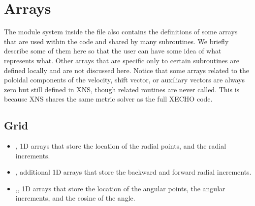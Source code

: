 \documentclass[letterpaper,10pt,english]{sphinxmanual}
\begin{document}
\chapter{Arrays}
\label{\detokenize{arrays:arrays}}\label{\detokenize{arrays::doc}}
\sphinxAtStartPar
The module system inside the file  also contains the definitions of some arrays that
are used within the code and shared by many subroutines. We briefly describe some of them here so that the
user can have some idea of what represents what. Other arrays that are specific only to certain subroutines
are defined locally and are not discussed here. Notice that some arrays related to the poloidal components
of the velocity, shift vector, or auxiliary vectors are always zero but still defined in XNS, though related
routines are never called. This is because XNS shares the same metric solver as the full X\sphinxhyphen{}ECHO code.


\section{Grid}
\label{\detokenize{arrays:grid}}\begin{itemize}
\item {} 
\sphinxAtStartPar
{}, \sphinxhyphen{} 1D arrays that store the location of the radial points, and the radial increments.


\item {} 
\sphinxAtStartPar
{}, \sphinxhyphen{} additional 1D arrays that store the backward and forward radial increments.


\item {} 
\sphinxAtStartPar
{},, \sphinxhyphen{} 1D arrays that store the location of the angular points, the angular increments, and the
cosine of the angle.

\end{itemize}
\end{document}
